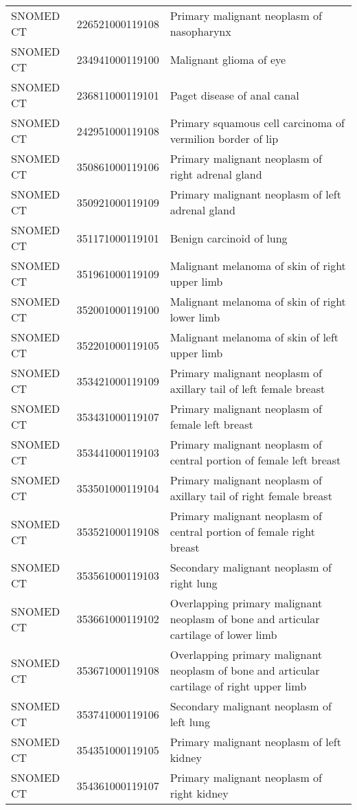 \begin{longtable}{p{}p{}p{}}
  SNOMED CT & 226521000119108 & Primary malignant neoplasm of nasopharynx \\ 
  SNOMED CT & 234941000119100 & Malignant glioma of eye \\ 
  SNOMED CT & 236811000119101 & Paget disease of anal canal \\ 
  SNOMED CT & 242951000119108 & Primary squamous cell carcinoma of vermilion border of lip \\ 
  SNOMED CT & 350861000119106 & Primary malignant neoplasm of right adrenal gland \\ 
  SNOMED CT & 350921000119109 & Primary malignant neoplasm of left adrenal gland \\ 
  SNOMED CT & 351171000119101 & Benign carcinoid of lung \\ 
  SNOMED CT & 351961000119109 & Malignant melanoma of skin of right upper limb \\ 
  SNOMED CT & 352001000119100 & Malignant melanoma of skin of right lower limb \\ 
  SNOMED CT & 352201000119105 & Malignant melanoma of skin of left upper limb \\ 
  SNOMED CT & 353421000119109 & Primary malignant neoplasm of axillary tail of left female breast \\ 
  SNOMED CT & 353431000119107 & Primary malignant neoplasm of female left breast \\ 
  SNOMED CT & 353441000119103 & Primary malignant neoplasm of central portion of female left breast \\ 
  SNOMED CT & 353501000119104 & Primary malignant neoplasm of axillary tail of right female breast \\ 
  SNOMED CT & 353521000119108 & Primary malignant neoplasm of central portion of female right breast \\ 
  SNOMED CT & 353561000119103 & Secondary malignant neoplasm of right lung \\ 
  SNOMED CT & 353661000119102 & Overlapping primary malignant neoplasm of bone and articular cartilage of lower limb \\ 
  SNOMED CT & 353671000119108 & Overlapping primary malignant neoplasm of bone and articular cartilage of right upper limb \\ 
  SNOMED CT & 353741000119106 & Secondary malignant neoplasm of left lung \\ 
  SNOMED CT & 354351000119105 & Primary malignant neoplasm of left kidney \\ 
  SNOMED CT & 354361000119107 & Primary malignant neoplasm of right kidney \\ 

\end{longtable}
